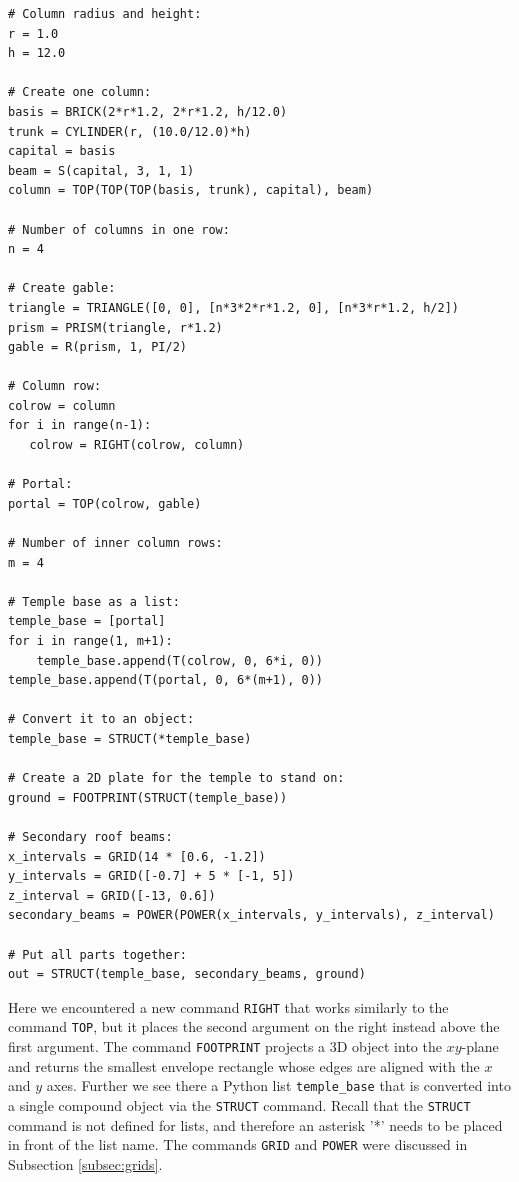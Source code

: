 {\small
\begin{bbox}
\begin{verbatim}
# Column radius and height:
r = 1.0
h = 12.0

# Create one column:
basis = BRICK(2*r*1.2, 2*r*1.2, h/12.0) 
trunk = CYLINDER(r, (10.0/12.0)*h)
capital = basis
beam = S(capital, 3, 1, 1) 
column = TOP(TOP(TOP(basis, trunk), capital), beam)

# Number of columns in one row:
n = 4

# Create gable:
triangle = TRIANGLE([0, 0], [n*3*2*r*1.2, 0], [n*3*r*1.2, h/2])
prism = PRISM(triangle, r*1.2)
gable = R(prism, 1, PI/2)

# Column row:
colrow = column
for i in range(n-1):
   colrow = RIGHT(colrow, column)

# Portal:
portal = TOP(colrow, gable)

# Number of inner column rows:
m = 4

# Temple base as a list:
temple_base = [portal]
for i in range(1, m+1):
    temple_base.append(T(colrow, 0, 6*i, 0))
temple_base.append(T(portal, 0, 6*(m+1), 0))

# Convert it to an object:
temple_base = STRUCT(*temple_base)

# Create a 2D plate for the temple to stand on:
ground = FOOTPRINT(STRUCT(temple_base))

# Secondary roof beams:
x_intervals = GRID(14 * [0.6, -1.2])
y_intervals = GRID([-0.7] + 5 * [-1, 5])
z_interval = GRID([-13, 0.6])
secondary_beams = POWER(POWER(x_intervals, y_intervals), z_interval)

# Put all parts together:
out = STRUCT(temple_base, secondary_beams, ground)
\end{verbatim}
\end{bbox}
}
\vspace{6mm}

\noindent
Here we encountered a new command {\tt RIGHT}
that works similarly to the command {\tt TOP}, but it places
the second argument on the right instead above the
first argument. The command {\tt FOOTPRINT} projects 
a 3D object into the $xy$-plane and returns the smallest 
envelope rectangle whose edges are aligned with the $x$ and 
$y$ axes. Further we see there a Python list {\tt temple\_base}
that is converted into a single compound object via the {\tt STRUCT} 
command. Recall that the {\tt STRUCT} command is not defined for lists,
and therefore an asterisk '*' needs to be placed in front
of the list name. The commands {\tt GRID} and {\tt POWER} were
discussed in Subsection \ref{subsec:grids}.


